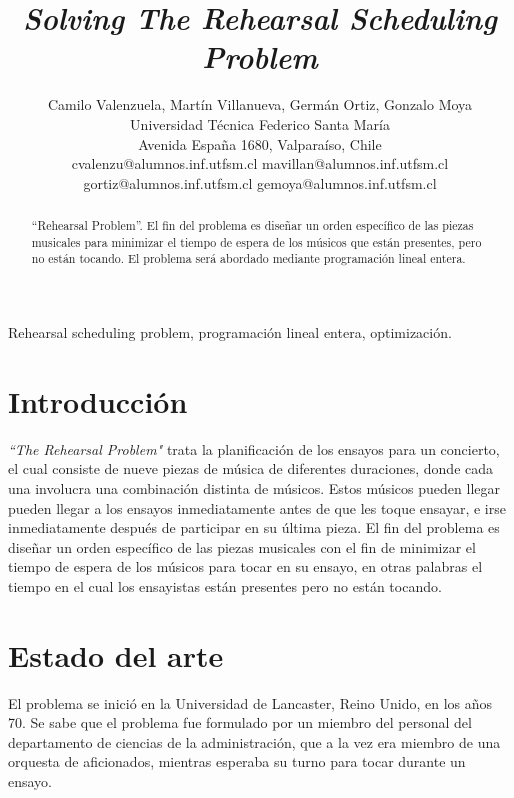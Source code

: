 \documentclass[journal, 10pt]{IEEEtran}
\begin{document}
\title{\textit{Solving The Rehearsal Scheduling Problem}}
\author{Camilo Valenzuela, Martín Villanueva, Germán Ortiz, Gonzalo Moya \\ Universidad Técnica Federico Santa María \\
Avenida España 1680, Valparaíso, Chile \\
cvalenzu@alumnos.inf.utfsm.cl mavillan@alumnos.inf.utfsm.cl gortiz@alumnos.inf.utfsm.cl gemoya@alumnos.inf.utfsm.cl}
\maketitle


\begin{abstract}
\boldmath ``Rehearsal Problem''. El fin del problema es diseñar un orden específico de las piezas musicales para minimizar el tiempo de espera de los músicos que están presentes, pero no están tocando. El problema será abordado mediante programación lineal entera.
\end{abstract}

\begin{IEEEkeywords}
	Rehearsal scheduling problem, programación lineal entera, optimización.
\end{IEEEkeywords}

\section{Introducción}

\textit{``The Rehearsal Problem"} trata la planificación de los ensayos para un concierto, el cual consiste de nueve piezas de música de diferentes duraciones, donde cada una involucra una combinación distinta de músicos. Estos músicos pueden llegar pueden llegar a los ensayos inmediatamente antes de que les toque ensayar, e irse inmediatamente después de participar en su última pieza. El fin del problema es diseñar un orden específico de las piezas musicales con el fin de minimizar el tiempo de espera de los músicos para tocar en su ensayo, en otras palabras el tiempo en el cual los ensayistas están presentes pero no están tocando. 

\section{Estado del arte}

El problema se inició en la Universidad de Lancaster, Reino Unido, en los años 70. Se sabe que el problema fue formulado por un miembro del personal del departamento de ciencias de la administración, que a la vez era miembro de una orquesta de aficionados, mientras esperaba su turno para tocar durante un ensayo.
\end{document}
